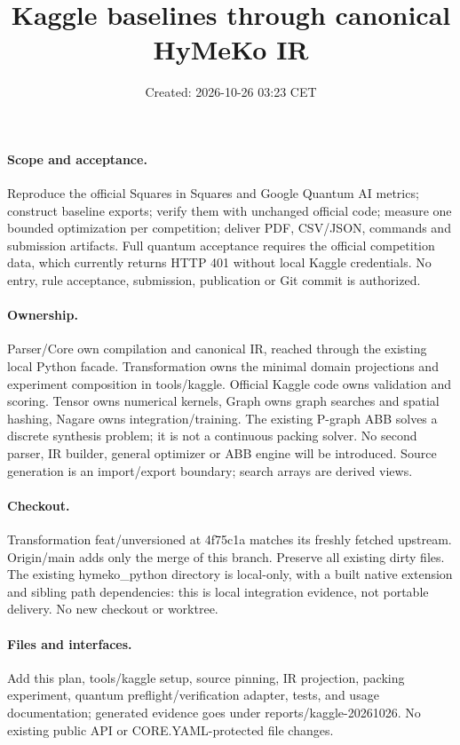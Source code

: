 \documentclass{article}
\title{Kaggle baselines through canonical HyMeKo IR}
\date{Created: 2026-10-26 03:23 CET}
\begin{document}
\maketitle
\paragraph{Scope and acceptance.} Reproduce the official Squares in Squares and Google Quantum AI metrics; construct baseline exports; verify them with unchanged official code; measure one bounded optimization per competition; deliver PDF, CSV/JSON, commands and submission artifacts. Full quantum acceptance requires the official competition data, which currently returns HTTP 401 without local Kaggle credentials. No entry, rule acceptance, submission, publication or Git commit is authorized.
\paragraph{Ownership.} Parser/Core own compilation and canonical IR, reached through the existing local Python facade. Transformation owns the minimal domain projections and experiment composition in tools/kaggle. Official Kaggle code owns validation and scoring. Tensor owns numerical kernels, Graph owns graph searches and spatial hashing, Nagare owns integration/training. The existing P-graph ABB solves a discrete synthesis problem; it is not a continuous packing solver. No second parser, IR builder, general optimizer or ABB engine will be introduced. Source generation is an import/export boundary; search arrays are derived views.
\paragraph{Checkout.} Transformation feat/unversioned at 4f75c1a matches its freshly fetched upstream. Origin/main adds only the merge of this branch. Preserve all existing dirty files. The existing hymeko\_python directory is local-only, with a built native extension and sibling path dependencies: this is local integration evidence, not portable delivery. No new checkout or worktree.
\paragraph{Files and interfaces.} Add this plan, tools/kaggle setup, source pinning, IR projection, packing experiment, quantum preflight/verification adapter, tests, and usage documentation; generated evidence goes under reports/kaggle-20261026. No existing public API or CORE.YAML-protected file changes.
\end{document}
